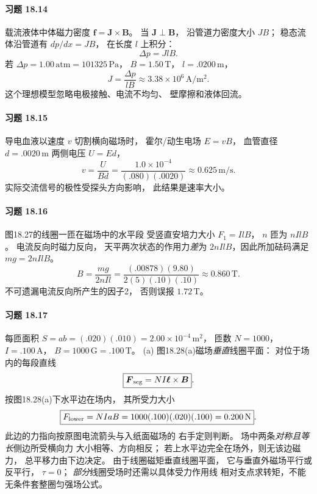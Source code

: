 \paragraph{习题 18.14}
载流液体中体磁力密度
\(\boldsymbol f=\boldsymbol J\times\boldsymbol B\)。
当 \(\boldsymbol J\perp\boldsymbol B\)，
沿管道力密度大小 \(JB\)；
稳态流体沿管道有
\(dp/dx=JB\)，
在长度 \(l\) 上积分：
\[
 \boxed{\Delta p=JlB}.
\]
若 \(\Delta p=1.00\,\mathrm{atm}
 =101325\,\mathrm{Pa}\)，
\(B=1.50\,\mathrm T\)，
\(l=.0200\,\mathrm m\)，
\[
 \boxed{J=\frac{\Delta p}{lB}
 \approx3.38\times10^6\,\mathrm{A/m^2}}.
\]
这个理想模型忽略电极接触、电流不均匀、
壁摩擦和液体回流。

\paragraph{习题 18.15}
导电血液以速度 \(v\) 切割横向磁场时，
霍尔/动生电场 \(E=vB\)，
血管直径 \(d=.0020\,\mathrm m\)
两侧电压 \(U=E d\)，
\[
 \boxed{v=\frac U{Bd}
 =\frac{1.0\times10^{-4}}{(.080)(.0020)}
 \approx0.625\,\mathrm{m/s}}.
\]
实际交流信号的极性受探头方向影响，
此结果是速率大小。


\paragraph{习题 18.16}
图18.27的线圈一匝在磁场中的水平段
受竖直安培力大小 \(F_1=IlB\)，
\(n\) 匝为 \(nIlB\)。
电流反向时磁力反向，
天平两次状态的作用力\emph{差}为
\(2nIlB\)，因此所加砝码满足
\(mg=2nIlB\)。
\[
 \boxed{B=\frac{mg}{2nIl}
 =\frac{(.00878)(9.80)}
 {2(5)(.10)(.10)}
 \approx0.860\,\mathrm T}.
\]
不可遗漏电流反向所产生的因子2，
否则误报 \(1.72\,\mathrm T\)。

\paragraph{习题 18.17}
每匝面积
\(S=ab=(.020)(.010)=2.00\times10^{-4}\,\mathrm{m^2}\)，
匝数 \(N=1000\)，
\(I=.100\,\mathrm A\)，
\(B=1000\,\mathrm G=.100\,\mathrm T\)。
(a) 图18.28(a)磁场\emph{垂直}线圈平面：
对位于场内的每段直线
\[
 \boxed{\boldsymbol F_{\rm seg}
 =NI\boldsymbol\ell\times\boldsymbol B}.
\]
按图18.28(a)下水平边在场内，
其所受力大小
\[
 \boxed{F_{\rm lower}=NIaB
 =1000(.100)(.020)(.100)=0.200\,\mathrm N}.
\]
此边的力指向按原图电流箭头与入纸面磁场的
右手定则判断。
场中两条\emph{对称且等长}侧边所受横向力
大小相等、方向相反；
若上水平边完全在场外，则无该边磁力，
总平移力由下边决定。
由于线圈磁矩垂直线圈平面，
它与垂直外磁场平行或反平行，
\(\tau=0\)；
\emph{部分}线圈受场时还需以具体受力作用线
相对支点求转矩，不能无条件套整圈匀强场公式。

